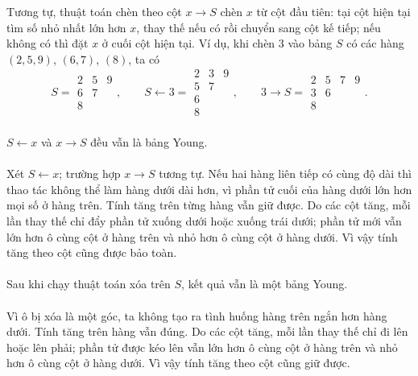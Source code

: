 \documentclass[11pt]{article}
\begin{document}
Tương tự, thuật toán chèn theo cột \(x\to S\) chèn \(x\) từ cột đầu tiên:
tại cột hiện tại tìm số nhỏ nhất lớn hơn \(x\), thay thế nếu có rồi chuyển
sang cột kế tiếp; nếu không có thì đặt \(x\) ở cuối cột hiện tại. Ví dụ, khi
chèn \(3\) vào bảng \(S\) có các hàng \((2,5,9)\), \((6,7)\), \((8)\), ta có
\[
S=\begin{array}{ccc}
2&5&9\\
6&7\\
8
\end{array},
\qquad
S\leftarrow3=
\begin{array}{ccc}
2&3&9\\
5&7\\
6\\
8
\end{array},
\qquad
3\to S=
\begin{array}{cccc}
2&5&7&9\\
3&6\\
8
\end{array}.
\]

\paragraph{}
\(S\leftarrow x\) và \(x\to S\) đều vẫn là bảng Young.

\paragraph{}
Xét \(S\leftarrow x\); trường hợp \(x\to S\) tương tự. Nếu hai hàng liên tiếp
có cùng độ dài thì thao tác không thể làm hàng dưới dài hơn, vì phần tử cuối
của hàng dưới lớn hơn mọi số ở hàng trên. Tính tăng trên từng hàng vẫn giữ
được. Do các cột tăng, mỗi lần thay thế chỉ đẩy phần tử xuống dưới hoặc xuống
trái dưới; phần tử mới vẫn lớn hơn ô cùng cột ở hàng trên và nhỏ hơn ô cùng
cột ở hàng dưới. Vì vậy tính tăng theo cột cũng được bảo toàn.

\paragraph{}
Sau khi chạy thuật toán xóa trên \(S\), kết quả vẫn là một bảng Young.

\paragraph{}
Vì ô bị xóa là một góc, ta không tạo ra tình huống hàng trên ngắn hơn hàng
dưới. Tính tăng trên hàng vẫn đúng. Do các cột tăng, mỗi lần thay thế chỉ đi
lên hoặc lên phải; phần tử được kéo lên vẫn lớn hơn ô cùng cột ở hàng trên và
nhỏ hơn ô cùng cột ở hàng dưới. Vì vậy tính tăng theo cột cũng giữ được.
\end{document}
